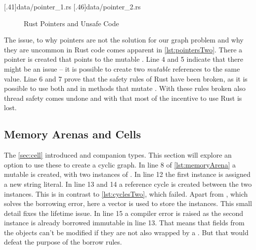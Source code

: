 \documentclass[thesis]{subfiles}
\begin{document}
    \LstTikzBox{\pointersOne}[.41\linewidth]{data/pointer_1.rs}
    \LstTikzBox{\pointersTwo}[.46\linewidth]{data/pointer_2.rs}
    \begin{figure}[ht]
      \captionsetup{type=lstlisting}
       \hfill%
      \caption{Rust Pointers and Unsafe Code}\label{lst:pointers}
    \end{figure}

    The issue, to why pointers are not the solution for our graph problem and why they are uncommon in Rust code comes apparent in \autoref{lst:pointersTwo}.
    There a pointer  is created that points to the mutable \String {}.
    Line 4 and 5 indicate that there might be an issue -- it is possible to create two \emph{mutable} references to the same value.
    Line 6 and 7 prove that the safety rules of Rust have been broken, as it is possible to use both  and  in methods that mutate .
    With these rules broken also thread safety comes undone and with that most of the incentive to use Rust is lost.

  \subsection{Memory Arenas and Cells}\label{sec:memoryArena}
    The \autoref{sec:cell} introduced \UnsafeCellT and companion types.
    This section will explore an option to use these to create a cyclic graph.
    In line 8 of \autoref{lst:memoryArena} a mutable \Vec is created, with two instances of \Node.
    In line 12 the first instance is assigned a new string literal.
    In line 13 and 14 a reference cycle is created between the two \Foo instances.
    This is in contrast to \autoref{lst:cyclesTwo}, which failed.
    Apart from \UnsafeCellT, which solves the borrowing error, here a vector is used to store the \Node instances.
    This small detail fixes the lifetime issue.
    In line 15 a compiler error is raised as the second \Node instance is already borrowed immutable in line 13.
    That means that fields from the objects can't be modified if they are not also wrapped by a \UnsafeCellT.
    But that would defeat the purpose of the borrow rules.

\end{document}

